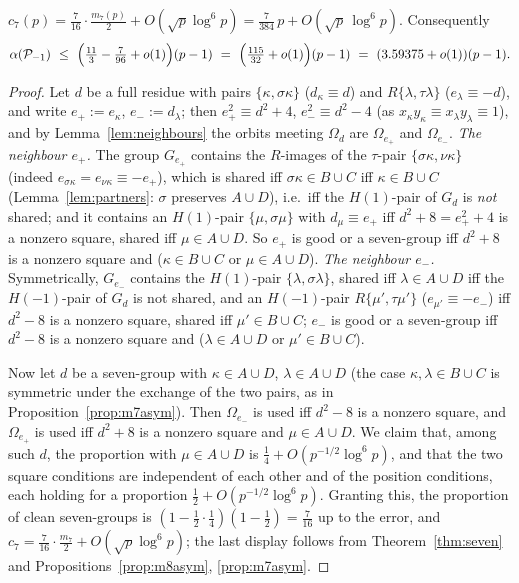 \begin{proposition}\label{prop:clean}
$c_7(p)=\tfrac7{16}\cdot\tfrac{m_7(p)}2+O(\sqrt p\log^6p)=\tfrac{7}{384}\,p+O(\sqrt p\,\log^6p)$.  Consequently
\[
 \alpha(\Pset_{-1})\ \le\ \Bigl(\tfrac{11}3-\tfrac7{96}+o(1)\Bigr)(p-1)\ =\ \Bigl(\tfrac{115}{32}+o(1)\Bigr)(p-1)\ =\ (3.59375+o(1))(p-1).
\]
\end{proposition}
\begin{proof}
Let $d$ be a full residue with pairs $\{\kappa,\sigma\kappa\}$ ($d_\kappa\equiv d$) and $R\{\lambda,\tau\lambda\}$ ($e_\lambda\equiv-d$), and write
$e_+:=e_\kappa$, $e_-:=d_\lambda$; then $e_+^2\equiv d^2+4$, $e_-^2\equiv d^2-4$ (as $x_\kappa y_\kappa\equiv x_\lambda y_\lambda\equiv1$), and by
Lemma~\ref{lem:neighbours} the orbits meeting $\Omega_d$ are $\Omega_{e_+}$ and $\Omega_{e_-}$.  \emph{The neighbour $e_+$.}  The group
$G_{e_+}$ contains the $R$-images of the $\tau$-pair $\{\sigma\kappa,\nu\kappa\}$ (indeed $e_{\sigma\kappa}=e_{\nu\kappa}\equiv-e_+$), which is
shared iff $\sigma\kappa\in B\cup C$ iff $\kappa\in B\cup C$ (Lemma~\ref{lem:partners}: $\sigma$ preserves $A\cup D$), i.e.\ iff the $H(1)$-pair
of $G_d$ is \emph{not} shared; and it contains an $H(1)$-pair $\{\mu,\sigma\mu\}$ with $d_\mu\equiv e_+$ iff $d^2+8=e_+^2+4$ is a nonzero
square, shared iff $\mu\in A\cup D$.  So $e_+$ is good or a seven-group iff $d^2+8$ is a nonzero square and ($\kappa\in B\cup C$ or
$\mu\in A\cup D$).  \emph{The neighbour $e_-$.}  Symmetrically, $G_{e_-}$ contains the $H(1)$-pair $\{\lambda,\sigma\lambda\}$, shared iff
$\lambda\in A\cup D$ iff the $H(-1)$-pair of $G_d$ is not shared, and an $H(-1)$-pair $R\{\mu',\tau\mu'\}$ ($e_{\mu'}\equiv-e_-$) iff
$d^2-8$ is a nonzero square, shared iff $\mu'\in B\cup C$; $e_-$ is good or a seven-group iff $d^2-8$ is a nonzero square and
($\lambda\in A\cup D$ or $\mu'\in B\cup C$).

Now let $d$ be a seven-group with $\kappa\in A\cup D$, $\lambda\in A\cup D$ (the case $\kappa,\lambda\in B\cup C$ is symmetric under the
exchange of the two pairs, as in Proposition~\ref{prop:m7asym}).  Then $\Omega_{e_-}$ is used iff $d^2-8$ is a nonzero square, and
$\Omega_{e_+}$ is used iff $d^2+8$ is a nonzero square and $\mu\in A\cup D$.  We claim that, among such $d$, the proportion with
$\mu\in A\cup D$ is $\tfrac14+O(p^{-1/2}\log^6p)$, and that the two square conditions are independent of each other and of the position
conditions, each holding for a proportion $\tfrac12+O(p^{-1/2}\log^6p)$.  Granting this, the proportion of clean seven-groups is
$(1-\tfrac12\cdot\tfrac14)(1-\tfrac12)=\tfrac7{16}$ up to the error, and $c_7=\tfrac7{16}\cdot\tfrac{m_7}2+O(\sqrt p\log^6p)$; the last
display follows from Theorem~\ref{thm:seven} and Propositions~\ref{prop:m8asym}, \ref{prop:m7asym}.


\end{proof}
